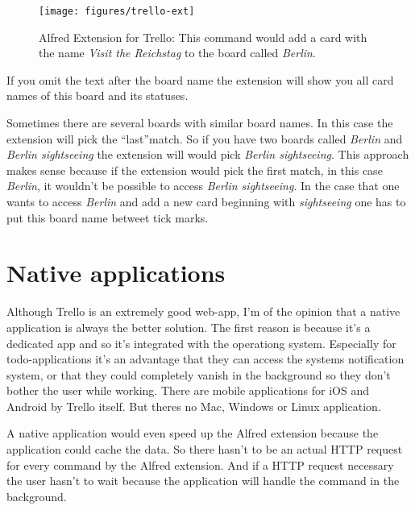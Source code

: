 \begin{figure}[htb]
\centering
\texttt{[image: figures/trello-ext]}
\caption{Alfred Extension for Trello: This command would add a card with the name \emph{Visit the Reichstag} to the board called \emph{Berlin}.}
\label{fig:trello-ext}
\end{figure}

If you omit the text after the board name the extension will show you all card names of this board and its statuses.

Sometimes there are several boards with similar board names. In this case the extension will pick the \textquotedblleft last\textquotedblright match. So if you have two boards called \emph{Berlin} and \emph{Berlin sightseeing} the extension will would pick \emph{Berlin sightseeing}. This approach makes sense because if the extension would pick the first match, in this case \emph{Berlin}, it wouldn't be possible to access \emph{Berlin sightseeing}. In the case that one wants to access \emph{Berlin} and add a new card beginning with \emph{sightseeing} one has to put this board name betweet tick marks.


\section{Native applications}
Although Trello is an extremely good web-app, I'm of the opinion that a native application is always the better solution. The first reason is because it's a dedicated app and so it's integrated with the operationg system. Especially for todo-applications it's an advantage that they can access the systems notification system, or that they could completely vanish in the background so they don't bother the user while working. There are mobile applications for iOS \cite{trello:ios} and Android \cite{trello:android} by Trello itself. But theres no Mac, Windows or Linux application.

A native application would even speed up the Alfred extension because the application could cache the data. So there hasn't to be an actual HTTP request for every command by the Alfred extension. And if a HTTP request necessary the user hasn't to wait because the application will handle the command in the background.